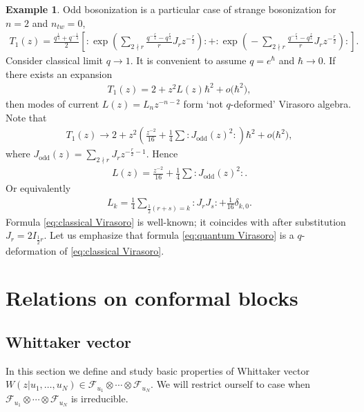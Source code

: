 \documentclass[pdftex]{sigma}
\numberwithin{equation}{section}
\theoremstyle{definition}
\newtheorem{Example}[Theorem]{Example}
\begin{document}
\begin{Example}Odd bosonization is a particular case of strange bosonization for $n=2$ and $n_{tw}=0$,
\begin{gather}
T_1 (z) = \frac{q^{\frac{1}{4}}+q^{-\frac{1}{4}}}{2} \left[ : \! \exp\! \left(\! \sum_{2 \nmid r} \frac{q^{-\frac{r}{4}}-q^{\frac{r}{4}}}{r} J_r z^{-\frac{r}{2}}\! \right) \! : + : \! \exp \!\left(\! -\sum_{2 \nmid r} \frac{q^{-\frac{r}{4}}-q^{\frac{r}{4}}}{r} J_r z^{-\frac{r}{2}} \!\right) \! : \right]\!.\!\!\! \label{eq:quantum Virasoro}
\end{gather}
Consider classical limit $q \rightarrow 1$. It is convenient to assume $q=e^{\hbar}$ and $\hbar \rightarrow 0$. If there exists an expansion
\begin{gather*}
T_1(z)= 2 + z^2 L(z) \hbar^2 + o\big(\hbar^2\big),
\end{gather*}
then modes of current $L(z) = L_n z^{-n-2}$ form `not $q$-deformed' Virasoro algebra. Note that
\begin{gather*}
T_1(z) \rightarrow 2 + z^2 \left(\frac{z^{-2}}{16} + \frac{1}{4} \sum :\!J_{\text{odd}}(z)^2\!\!: \right) \hbar^2 + o\big(\hbar^2\big),
\end{gather*}
where $J_{\text{odd}}(z) = \sum_{2 \nmid r} J_r z^{-\frac{r}{2}-1}$.
Hence
\begin{gather*}
L(z) = \frac{z^{-2}}{16} + \frac{1}{4} \sum :\!J_{\text{odd}}(z)^2\!\!:.
\end{gather*}
Or equivalently
\begin{gather}
L_k = \frac{1}{4} \sum_{\frac12 (r+s)=k} : \! J_r J_s \! : + \frac{1}{16} \delta_{k,0}. \label{eq:classical Virasoro}
\end{gather}
Formula \eqref{eq:classical Virasoro} is well-known; it coincides with \cite[equation~(2.16)]{Z} after substitution $J_r = 2I_{\frac12r}$. Let us emphasize that formula \eqref{eq:quantum Virasoro} is a $q$-deformation of \eqref{eq:classical Virasoro}.
\end{Example}

\section{Relations on conformal blocks}\label{section: conformal}

\subsection{Whittaker vector}
In this section we define and study basic properties of Whittaker vector $W(z|u_1, \dots, u_N) \in \mathcal{F}_{u_1} \otimes \cdots \otimes \mathcal{F}_{u_N}$. We will restrict ourself to case when $\mathcal{F}_{u_1} \otimes \cdots \otimes \mathcal{F}_{u_N}$ is irreducible.
\end{document}
